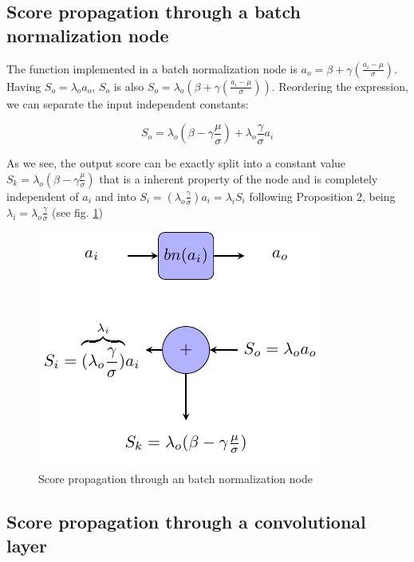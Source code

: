 \documentclass[review]{elsarticle}
\theoremstyle{definition} %
\theoremstyle{remark}
\begin{document}
\subsection{Score propagation through a batch normalization node} 

The function implemented in a batch normalization node is $a_o = \beta + \gamma (\frac{a_i - \mu}{\sigma})$. Having $S_o = \lambda_o a_o$, $S_o$ is also $S_o = \lambda_o ( \beta + \gamma (\frac{a_i - \mu}{\sigma}))$. Reordering the expression, we can separate the input independent constants: 

\begin{equation}
	S_o = \lambda_o (\beta - \gamma \frac{\mu}{\sigma}) + \lambda_o \frac{\gamma}{\sigma}a_i
\end{equation}

As we see, the output score can be exactly split into a constant value $S_k = \lambda_o (\beta - \gamma \frac{\mu}{\sigma})$ that is a inherent property of the node and is completely independent of $a_i$ and into $S_i = (\lambda_o \frac{\gamma}{\sigma})a_i = \lambda_i S_i$ following Proposition 2, being $\lambda_i = \lambda_o \frac{\gamma}{\sigma}$ (see fig. \ref{fig:score_bn})

\begin{figure}[!ht]
	\centering
	\includegraphics{./figures/score_bn.pdf}
	\caption{Score propagation through an batch normalization node}
	\label{fig:score_bn}
\end{figure}

\subsection{Score propagation through a convolutional layer}
\end{document}
